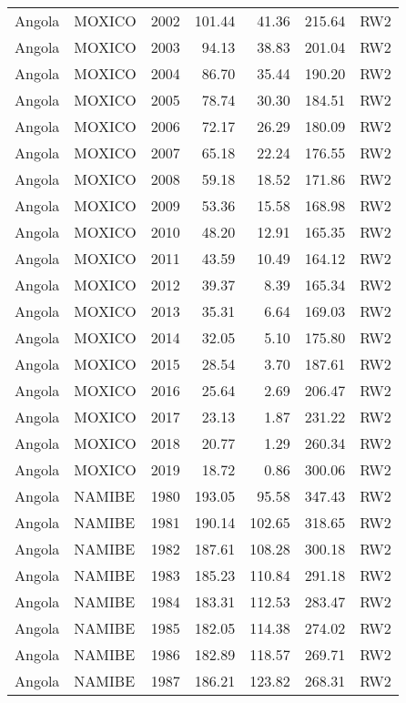 \begin{longtable}{lllrrrl}
  Angola & MOXICO & 2002 & 101.44 & 41.36 & 215.64 & RW2 \\ 
  Angola & MOXICO & 2003 & 94.13 & 38.83 & 201.04 & RW2 \\ 
  Angola & MOXICO & 2004 & 86.70 & 35.44 & 190.20 & RW2 \\ 
  Angola & MOXICO & 2005 & 78.74 & 30.30 & 184.51 & RW2 \\ 
  Angola & MOXICO & 2006 & 72.17 & 26.29 & 180.09 & RW2 \\ 
  Angola & MOXICO & 2007 & 65.18 & 22.24 & 176.55 & RW2 \\ 
  Angola & MOXICO & 2008 & 59.18 & 18.52 & 171.86 & RW2 \\ 
  Angola & MOXICO & 2009 & 53.36 & 15.58 & 168.98 & RW2 \\ 
  Angola & MOXICO & 2010 & 48.20 & 12.91 & 165.35 & RW2 \\ 
  Angola & MOXICO & 2011 & 43.59 & 10.49 & 164.12 & RW2 \\ 
  Angola & MOXICO & 2012 & 39.37 & 8.39 & 165.34 & RW2 \\ 
  Angola & MOXICO & 2013 & 35.31 & 6.64 & 169.03 & RW2 \\ 
  Angola & MOXICO & 2014 & 32.05 & 5.10 & 175.80 & RW2 \\ 
  Angola & MOXICO & 2015 & 28.54 & 3.70 & 187.61 & RW2 \\ 
  Angola & MOXICO & 2016 & 25.64 & 2.69 & 206.47 & RW2 \\ 
  Angola & MOXICO & 2017 & 23.13 & 1.87 & 231.22 & RW2 \\ 
  Angola & MOXICO & 2018 & 20.77 & 1.29 & 260.34 & RW2 \\ 
  Angola & MOXICO & 2019 & 18.72 & 0.86 & 300.06 & RW2 \\ 
  Angola & NAMIBE & 1980 & 193.05 & 95.58 & 347.43 & RW2 \\ 
  Angola & NAMIBE & 1981 & 190.14 & 102.65 & 318.65 & RW2 \\ 
  Angola & NAMIBE & 1982 & 187.61 & 108.28 & 300.18 & RW2 \\ 
  Angola & NAMIBE & 1983 & 185.23 & 110.84 & 291.18 & RW2 \\ 
  Angola & NAMIBE & 1984 & 183.31 & 112.53 & 283.47 & RW2 \\ 
  Angola & NAMIBE & 1985 & 182.05 & 114.38 & 274.02 & RW2 \\ 
  Angola & NAMIBE & 1986 & 182.89 & 118.57 & 269.71 & RW2 \\ 
  Angola & NAMIBE & 1987 & 186.21 & 123.82 & 268.31 & RW2 \\ 

\end{longtable}
